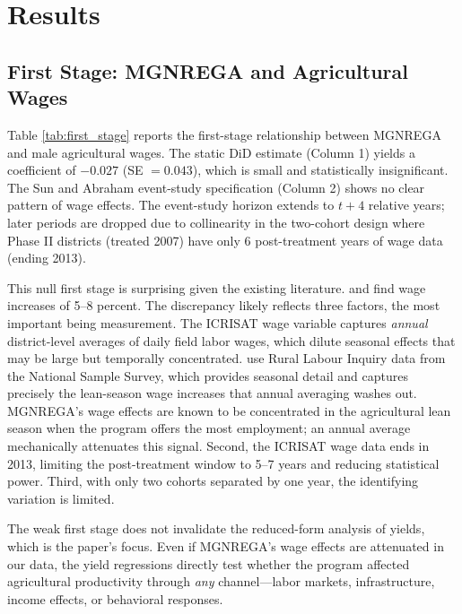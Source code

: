 \documentclass[12pt]{article}
\begin{document}
\section{Results}

\subsection{First Stage: MGNREGA and Agricultural Wages}



Table \ref{tab:first_stage} reports the first-stage relationship between MGNREGA and male agricultural wages. The static DiD estimate (Column 1) yields a coefficient of $-0.027$ (SE $= 0.043$), which is small and statistically insignificant. The Sun and Abraham event-study specification (Column 2) shows no clear pattern of wage effects. The event-study horizon extends to $t+4$ relative years; later periods are dropped due to collinearity in the two-cohort design where Phase II districts (treated 2007) have only 6 post-treatment years of wage data (ending 2013).

This null first stage is surprising given the existing literature. \citet{imbert2015labor} and \citet{berg2018can} find wage increases of 5--8 percent. The discrepancy likely reflects three factors, the most important being measurement. The ICRISAT wage variable captures \textit{annual} district-level averages of daily field labor wages, which dilute seasonal effects that may be large but temporally concentrated. \citet{imbert2015labor} use Rural Labour Inquiry data from the National Sample Survey, which provides seasonal detail and captures precisely the lean-season wage increases that annual averaging washes out. MGNREGA's wage effects are known to be concentrated in the agricultural lean season when the program offers the most employment; an annual average mechanically attenuates this signal. Second, the ICRISAT wage data ends in 2013, limiting the post-treatment window to 5--7 years and reducing statistical power. Third, with only two cohorts separated by one year, the identifying variation is limited.

The weak first stage does not invalidate the reduced-form analysis of yields, which is the paper's focus. Even if MGNREGA's wage effects are attenuated in our data, the yield regressions directly test whether the program affected agricultural productivity through \textit{any} channel---labor markets, infrastructure, income effects, or behavioral responses.
\end{document}
